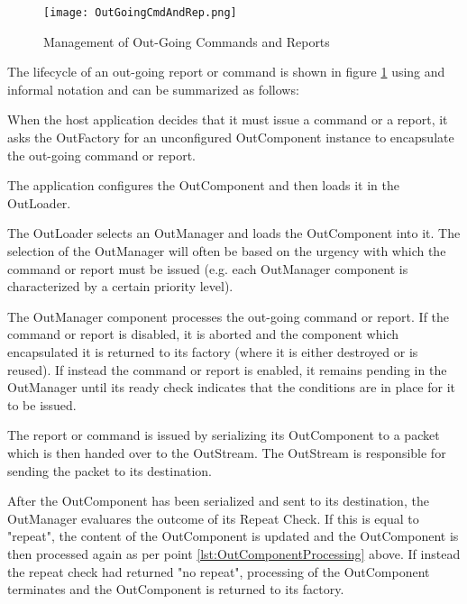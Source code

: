 \begin{figure}[h]
 \centering
 \texttt{[image: OutGoingCmdAndRep.png]}
 \caption{Management of Out-Going Commands and Reports}
 \label{fig:OutGoingCmdAndRep}
\end{figure}

The lifecycle of an out-going report or command is shown in figure \ref{fig:OutGoingCmdAndRep} using and informal notation and can be summarized as follows:
\begin{fw_enumerate}
\item When the host application decides that it must issue a command or a report, it asks the OutFactory for an unconfigured OutComponent instance to encapsulate the out-going command or report.
\item The application configures the OutComponent and then loads it in the OutLoader.
\item The OutLoader selects an OutManager and loads the OutComponent into it. The selection of the OutManager will often be based on the urgency with which the command or report must be issued (e.g. each OutManager component is characterized by a certain priority level). 
\item\label{lst:OutComponentProcessing} The OutManager component processes the out-going command or report. If the command or report is disabled, it is aborted and the component which encapsulated it is returned to its factory (where it is either destroyed or is reused). If instead the command or report is enabled, it remains pending in the OutManager until its ready check indicates that the conditions are in place for it to be issued. 
\item The report or command is issued by serializing its OutComponent to a packet which is then handed over to the OutStream. The OutStream is responsible for sending the packet to its destination. 
\item After the OutComponent has been serialized and sent to its destination, the OutManager evaluares the outcome of its Repeat Check. If this is equal to "repeat", the content of the OutComponent is updated and the OutComponent is then processed again as per point \ref{lst:OutComponentProcessing} above. If instead the repeat check had returned "no repeat", processing of the OutComponent terminates and the OutComponent is returned to its factory.
\end{fw_enumerate}


